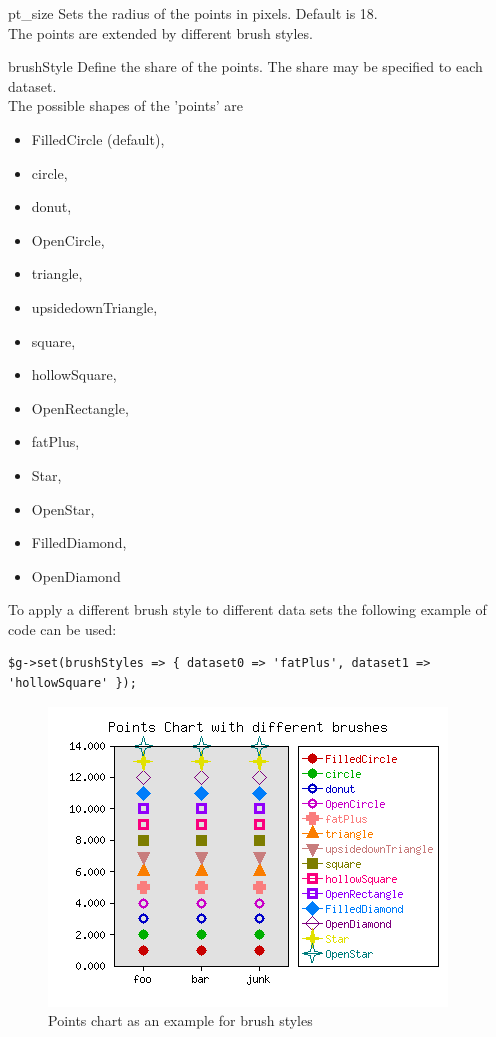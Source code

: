 \constructorblurb{\thisname}

\begin{AttrDecl}{pt\_size}
Sets the radius of the points in pixels. Default is 18.\\
The points are extended by different brush styles.
\end{AttrDecl}

\begin{AttrDecl}{brushStyle}
Define the share of the points. The share may be specified to each dataset.\\
The possible shapes of the 'points' are
\begin{itemize}
\item FilledCircle (default),
\item circle,
\item donut,
\item OpenCircle,
\item triangle,
\item upsidedownTriangle,
\item square,
\item hollowSquare,
\item OpenRectangle,
\item fatPlus,
\item Star,
\item OpenStar,
\item FilledDiamond, 
\item OpenDiamond
\end{itemize} 
To apply a different brush style to different data sets the following
example of code can be used:
\begin{verbatim}
$g->set(brushStyles => { dataset0 => 'fatPlus', dataset1 => 'hollowSquare' });
\end{verbatim}
\begin{figure}[htp]
  \begin{center}
    \includegraphics{brushstyles.png}
  \end{center}
  \caption{Points chart as an example for brush styles}
  \label{fig:brushStyles}
\end{figure}
\end{AttrDecl}

